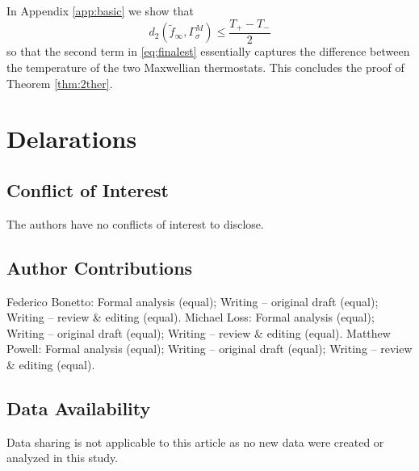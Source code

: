 \documentclass{article}
\begin{document}
In Appendix \ref{app:basic} we show that 
\begin{equation}\label{eq:diffT}
d_2(\tilde f_\infty, \Gamma_\sigma^M)\leq \frac{T_+-T_-}2
\end{equation}
so that the second term in \eqref{eq:finalest} essentially captures the difference between the temperature of the two 
Maxwellian thermostats. This concludes the proof of Theorem \ref{thm:2ther}.

\section*{Delarations}

\subsection*{Conflict of Interest}
The authors have no conflicts of interest to disclose.

\subsection*{Author Contributions}
Federico Bonetto: Formal analysis (equal); Writing – original draft (equal); Writing – review \& editing (equal). 
Michael Loss: Formal analysis (equal); Writing – original draft (equal); Writing – review \& editing (equal). 
Matthew Powell: Formal analysis (equal); Writing – original draft (equal); Writing – review \& editing (equal).


\subsection*{Data Availability}
Data sharing is not applicable to this article as no new data were created or analyzed in this study.







%
\end{document}
